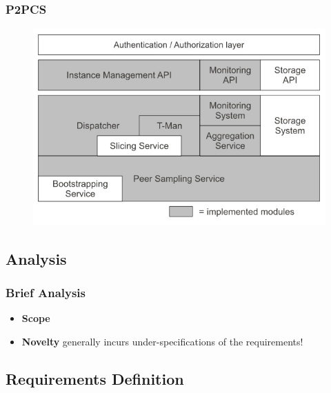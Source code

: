 \documentclass{beamer}
\begin{document}
\begin{frame}
  \frametitle{P2PCS}
  \begin{figure}
      \includegraphics[width=\textwidth,height=0.8\textheight,keepaspectratio]{p2pcs_arch.jpg}
    \end{figure}
\end{frame}

\subsection{Analysis}

\begin{frame}
  \frametitle{Brief Analysis}
  \begin{itemize}
  \item \textbf{Scope}
  \item \textbf{Novelty} generally incurs under-specifications of the requirements!
  \end{itemize}
\end{frame}

\subsection{Requirements Definition}
\end{document}
